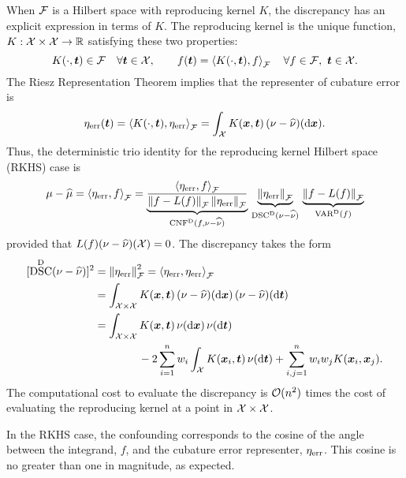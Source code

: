 \documentclass[graybox,footinfo]{svmult}
\DeclareMathOperator{\algn}{CNF}
\DeclareMathOperator{\disc}{DSC}
\DeclareMathOperator{\Var}{VAR}
\begin{document}
When $\cf$ is a Hilbert space with reproducing kernel $K$, the discrepancy has an 
explicit expression in terms of $K$.  The reproducing kernel is the unique function, $K: 
\cx \times \cx \to \R$ satisfying these two properties:
\begin{equation}
K(\cdot,\bst) \in \cf \quad \forall \bst \in \cx, \qquad f(\bst) = \ip[\cf]{K(\cdot,\bst)}{f} 
\quad \forall f \in \cf, \ \bst \in \cx.
\end{equation}
The Riesz Representation Theorem implies that the representer of cubature error 
is 
\begin{equation}
\eta_{\err}(\bst) = \ip[\cf]{K(\cdot,\bst)}{\eta_{\err}} = \int_{\cx} K(\bsx,\bst) \, (\nu - 
\hnu)(\D\bsx).
\end{equation}
Thus, the deterministic trio identity for the reproducing kernel Hilbert space (RKHS) case 
is
\begin{equation}
\mu - \widehat{\mu} =  \ip[\cf]{\eta_{\err}}{f} = 
\underbrace{\frac{\ip[\cf]{\eta_{\err}}{f}}{\norm{f - 
L(f)}_{\cf} \norm{\eta_{\err}}_{\cf}} }_{\algn^\Dt(f,\nu - \hnu)}\, 
\underbrace{\norm{\eta_{\err}}_{\cf}}_{\disc^{\Dt}(\nu - \hnu)} \, 
\underbrace{\norm{f - L(f)}_{\cf}}_{\Var^\Dt(f)}
\end{equation}
provided that $L(f) (\nu - \hnu)(\calX) = 0$.  The discrepancy  takes the 
form \cite{Hic99a}
\begin{align}
\nonumber
[\disc^{\Dt}(\nu - \hnu)]^2 & = \norm{\eta_{\err}}_{\cf}^2 = \ip[\cf]{\eta_{\err}}{\eta_{\err}} 
\\
\nonumber
& = \int_{\cx \times \cx} K(\bsx,\bst) \, (\nu - \hnu)(\D \bsx) \, (\nu - \hnu)(\D \bst) \\
\nonumber
& = \int_{\cx \times \cx} K(\bsx,\bst) \, \nu(\D \bsx) \, \nu (\D \bst)  \\
& \qquad \qquad - 2 \sum_{i=1}^n w_i 
\int_{\cx} K(\bsx_i,\bst) \, \nu(\D \bst)+ \sum_{i,j = 1}^n w_iw_jK(\bsx_i,\bsx_j).
\end{align}
The computational cost to evaluate the discrepancy is $\Order(n^2)$ times the cost of 
evaluating the reproducing kernel at a point in $\cx \times \cx$. 

\begin{FJHLesson} \FJHLessonTwoHalf \end{FJHLesson}

In the RKHS case, the confounding corresponds to 
the cosine of the angle between the integrand, $f$, and the cubature error representer, 
$\eta_{\err}$.  This cosine is no greater than one in magnitude, as expected.
\end{document}
